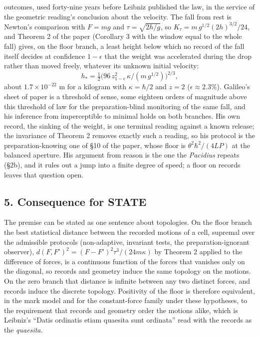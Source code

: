 \documentclass[11pt,a4paper]{article}
\begin{document}
\begin{itemize}
  outcomes, used forty-nine years before Leibniz published the law, in
  the service of the geometric reading's conclusion about the velocity.
  The fall from rest is Newton's comparison with \(F=mg\) and
  \(\tau=\sqrt{2h/g}\), so \(K_\tau=m\,g^{1/2}(2h)^{3/2}/24\), and
  Theorem 2 of the paper (Corollary 3 with the window equal to the whole
  fall) gives, on the floor branch, a least height below which no record
  of the fall itself decides at confidence \(1-\epsilon\) that the
  weight was accelerated during the drop rather than moved freely,
  whatever its unknown initial velocity:
  \[h_*=\tfrac12\bigl(96\,z_{1-\epsilon}^2\,\kappa/(m\,g^{1/2})\bigr)^{2/3},\]
  about \(1.7\times10^{-22}\) m for a kilogram with \(\kappa=\hbar/2\)
  and \(z=2\) (\(\epsilon\approx2.3\%\)). Galileo's sheet of paper is a
  threshold of sense, some eighteen orders of magnitude above this
  threshold of law for the preparation-blind monitoring of the same
  fall, and his inference from imperceptible to minimal holds on both
  branches. His own record, the sinking of the weight, is one terminal
  reading against a known release; the invariance of Theorem 2 removes
  exactly such a reading, so his protocol is the preparation-knowing one
  of §10 of the paper, whose floor is \(\theta^2\hbar^2/(4LP)\) at the
  balanced aperture. His argument from reason is the one the
  \emph{Pacidius} repeats (§2b), and it rules out a jump into a finite
  degree of speed; a floor on records leaves that question open.
\end{itemize}

\hypertarget{consequence-for-state}{%
\subsection{5. Consequence for STATE}\label{consequence-for-state}}

The premise can be stated as one sentence about topologies. On the floor
branch the best statistical distance between the recorded motions of a
cell, supremal over the admissible protocols (non-adaptive, invariant
tests, the preparation-ignorant observer),
\(d(F,F')^2=(F-F')^2\tau^3/(24m\kappa)\) by Theorem 2 applied to the
difference of forces, is a continuous function of the forces that
vanishes only on the diagonal, so records and geometry induce the same
topology on the motions. On the zero branch that distance is infinite
between any two distinct forces, and records induce the discrete
topology. Positivity of the floor is therefore equivalent, in the mark
model and for the constant-force family under these hypotheses, to the
requirement that records and geometry order the motions alike, which is
Leibniz's ``Datis ordinatis etiam quaesita sunt ordinata'' read with the
records as the \emph{quaesita}.
\end{document}
